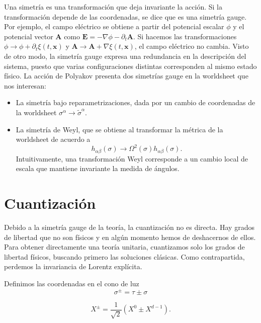 Una simetría es una transformación que deja invariante la acción. 
Si la transformación depende de las coordenadas, se dice que es una simetría gauge. 
Por ejemplo, el campo eléctrico se obtiene a partir del potencial escalar $\phi$ y
el potencial vector $\mathbf A$ como $\mathbf E = -\nabla \phi - \partial_t \mathbf A$.
Si hacemos las transformaciones $\phi \to \phi + \partial_t \xi(t,\mathbf x)$ y 
$\mathbf A \to \mathbf A + \nabla \xi(t,\mathbf x)$, el campo eléctrico no cambia.
Visto de otro modo, la simetría gauge expresa una redundancia en la descripción del sistema,  
puesto que varias configuraciones distintas corresponden al mismo estado físico.
La acción de Polyakov presenta dos simetrías gauge en la worldsheet que nos interesan:
\begin{itemize}
  \item La simetría bajo reparametrizaciones, dada por un cambio de coordenadas de la worldsheet $\sigma^\alpha \to \tilde \sigma^\alpha$. 
  \item La simetría de Weyl, que se obtiene al transformar la métrica de la worldsheet de acuerdo 
    a
    \begin{equation}
      h_{\alpha\beta}(\sigma) \to \Omega^2(\sigma) h_{\alpha\beta}(\sigma).
    \end{equation}
    Intuitivamente, una transformación Weyl corresponde a un cambio local de escala que mantiene
    invariante la medida de ángulos.
\end{itemize}



\section{Cuantización}

Debido a la simetría gauge de la teoría, la cuantización no es directa.
Hay grados de libertad que no son físicos y en algún momento hemos de deshacernos de ellos.
Para obtener directamente una teoría unitaria, cuantizamos solo los grados de libertad 
físicos, buscando primero las soluciones clásicas. 
Como contrapartida, perdemos la invariancia de Lorentz explícita.

Definimos las coordenadas en el cono de luz
\begin{equation}
  \sigma^\pm=\tau\pm\sigma
\end{equation}

\begin{equation}
  X^\pm=\frac{1}{\sqrt 2} (X^0 \pm X^{d-1}).
\end{equation}

